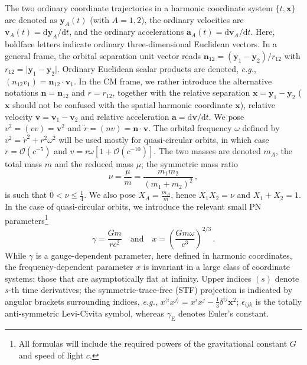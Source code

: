 \documentclass[prd,preprint,superscriptaddress,tightenlines,nofootinbib,
  eqsecnum,showpacs]{revtex4}
\newcommand{\ud}{\mathrm{d}}
\begin{document}
The two ordinary coordinate trajectories in a harmonic coordinate system
$\{t, \mathbf{x}\}$ are denoted as $\bm{y}_A(t)$ (with $A=1,2$), the ordinary
velocities are $\bm{v}_A(t)=\ud \bm{y}_A/\ud t$, and the ordinary
accelerations $\bm{a}_A(t)=\ud \bm{v}_A/\ud t$. Here, boldface letters
indicate ordinary three-dimensional Euclidean vectors. In a general frame, the
orbital separation unit vector reads
$\bm{n}_{12} = (\bm{y}_1-\bm{y}_2)/r_{12}$ with
$r_{12}=\vert\bm{y}_1-\bm{y}_2\vert$. Ordinary Euclidean scalar products are
denoted, \textit{e.g.}, $(n_{12} v_1) = \bm{n}_{12}\cdot\bm{v}_1$. In the CM
frame, we rather introduce the alternative notations $\bm{n} = \bm{n}_{12}$
and $r=r_{12}$, together with the relative separation
$\bm{x}=\bm{y}_1-\bm{y}_2$ ($\bm{x}$ should not be confused with the spatial
harmonic coordinate $\mathbf{x}$), relative velocity
$\bm{v}=\bm{v}_1-\bm{v}_2$ and relative acceleration
$\bm{a}=\ud \bm{v}/\ud t$. We pose $v^2=(v v) = \bm{v}^2$ and
$\dot{r}=(n v) = \bm{n}\cdot\bm{v}$. The orbital frequency $\omega$ defined by
$v^2 = \dot{r}^2 + r^2\omega^2$ will be used mostly for quasi-circular orbits,
in which case $\dot{r}=\mathcal{O}(c^{-5})$ and
$v=r\omega[1+\mathcal{O}(c^{-10})]$. The two masses are denoted $m_A$, the
total mass $m$ and the reduced mass $\mu$; the symmetric mass ratio
%
\begin{equation}\label{nu}
\nu = \frac{\mu}{m} = \frac{m_1m_2}{(m_1+m_2)^2}\,,
\end{equation} 
%
is such that $0<\nu\leqslant\frac{1}{4}$. We also pose $X_A=\frac{m_A}{m}$, hence
$X_1X_2=\nu$ and $X_1+X_2=1$. In the case of quasi-circular orbits, we introduce
the relevant small PN parameters\footnote{All formulas will include the
  required powers of the gravitational constant $G$ and speed of light $c$.}
%
\begin{equation}\label{gamx}
\gamma=\frac{G m}{r c^2}\quad\text{and}\quad x=\left(\frac{G m \omega}{c^3}\right)^{2/3}\,.
\end{equation} 
%
While $\gamma$ is a gauge-dependent parameter, here defined in harmonic
coordinates, the frequency-dependent parameter $x$ is invariant in a large
class of coordinate systems: those that are asymptotically flat at infinity.
Upper indices $(s)$ denote $s$-th time derivatives; the symmetric-trace-free
(STF) projection is indicated by angular brackets surrounding indices,
\textit{e.g.},
$x^{\langle i}x^{j\rangle}=x^i x^j - \frac{1}{3}\delta^{ij}\bm{x}^2$;
$\epsilon_{ijk}$ is the totally anti-symmetric Levi-Civita symbol, whereas
$\gamma_\text{E}$ denotes Euler's constant.
\end{document}
